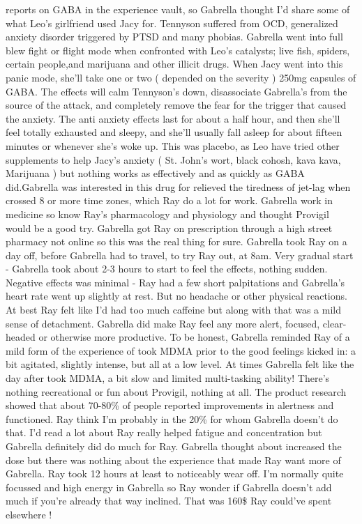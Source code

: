 \documentclass[12pt]{book}
\begin{document}
reports on GABA in the experience vault, so Gabrella thought I'd share some of what Leo's girlfriend used Jacy for. Tennyson suffered from OCD, generalized anxiety disorder triggered by PTSD and many phobias. Gabrella went into full blew fight or flight mode when confronted with Leo's catalysts; live fish, spiders, certain people,and marijuana and other illicit drugs. When Jacy went into this panic mode, she'll take one or two ( depended on the severity ) 250mg capsules of GABA. The effects will calm Tennyson's down, disassociate Gabrella's from the source of the attack, and completely remove the fear for the trigger that caused the anxiety. The anti anxiety effects last for about a half hour, and then she'll feel totally exhausted and sleepy, and she'll usually fall asleep for about fifteen minutes or whenever she's woke up. This was placebo, as Leo have tried other supplements to help Jacy's anxiety ( St. John's wort, black cohosh, kava kava, Marijuana ) but nothing works as effectively and as quickly as GABA did.Gabrella was interested in this drug for relieved the tiredness of jet-lag when crossed 8 or more time zones, which Ray do a lot for work. Gabrella work in medicine so know Ray's pharmacology and physiology and thought Provigil would be a good try. Gabrella got Ray on prescription through a high street pharmacy not online so this was the real thing for sure. Gabrella took Ray on a day off, before Gabrella had to travel, to try Ray out, at 8am. Very gradual start - Gabrella took about 2-3 hours to start to feel the effects, nothing sudden. Negative effects was minimal - Ray had a few short palpitations and Gabrella's heart rate went up slightly at rest. But no headache or other physical reactions. At best Ray felt like I'd had too much caffeine but along with that was a mild sense of detachment. Gabrella did make Ray feel any more alert, focused, clear-headed or otherwise more productive. To be honest, Gabrella reminded Ray of a mild form of the experience of took MDMA prior to the good feelings kicked in: a bit agitated, slightly intense, but all at a low level. At times Gabrella felt like the day after took MDMA, a bit slow and limited multi-tasking ability! There's nothing recreational or fun about Provigil, nothing at all. The product research showed that about 70-80\% of people reported improvements in alertness and functioned. Ray think I'm probably in the 20\% for whom Gabrella doesn't do that. I'd read a lot about Ray really helped fatigue and concentration but Gabrella definitely did do much for Ray. Gabrella thought about increased the dose but there was nothing about the experience that made Ray want more of Gabrella. Ray took 12 hours at least to noticeably wear off. I'm normally quite focussed and high energy in Gabrella so Ray wonder if Gabrella doesn't add much if you're already that way inclined. That was 160\$ Ray could've spent elsewhere !
\end{document}
